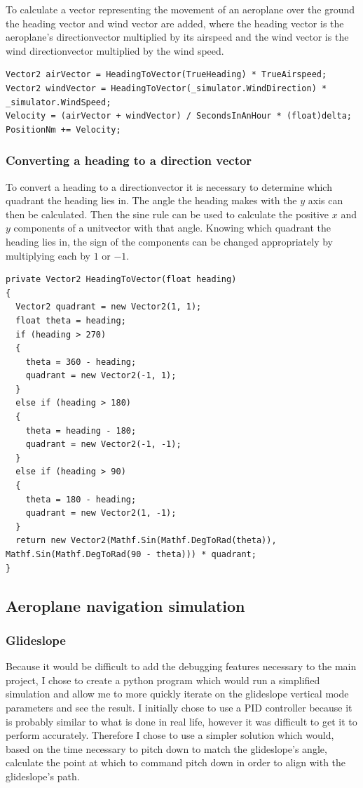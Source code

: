 \documentclass{article}
\begin{document}
To calculate a \gls{vector} representing the movement of an aeroplane over the ground the heading \gls{vector} and wind \gls{vector} are added, where the \gls{heading} \gls{vector} is the aeroplane's \gls{directionvector} multiplied by its \gls{airspeed} and the wind \gls{vector} is the wind \gls{directionvector} multiplied by the wind speed.
\lstset{style=csharp}
\begin{lstlisting}[caption=Extract of the aeroplane physics process]
Vector2 airVector = HeadingToVector(TrueHeading) * TrueAirspeed;
Vector2 windVector = HeadingToVector(_simulator.WindDirection) * _simulator.WindSpeed;
Velocity = (airVector + windVector) / SecondsInAnHour * (float)delta;
PositionNm += Velocity;
\end{lstlisting}

\subsubsection{Converting a heading to a direction vector}
To convert a \gls{heading} to a \gls{directionvector} it is necessary to determine which \gls{quadrant} the \gls{heading} lies in.
The angle the \gls{heading} makes with the $y$ axis can then be calculated.
Then the sine rule can be used to calculate the positive $x$ and $y$ components of a \gls{unitvector} with that angle.
Knowing which \gls{quadrant} the \gls{heading} lies in, the sign of the components can be changed appropriately by multiplying each by $1$ or $-1$.
\lstset{style=csharp}
\begin{lstlisting}[caption=Converting a heading to a vector]
private Vector2 HeadingToVector(float heading)
{
  Vector2 quadrant = new Vector2(1, 1);
  float theta = heading;
  if (heading > 270)
  {
    theta = 360 - heading;
    quadrant = new Vector2(-1, 1);
  }
  else if (heading > 180)
  {
    theta = heading - 180;
    quadrant = new Vector2(-1, -1);
  }
  else if (heading > 90)
  {
    theta = 180 - heading;
    quadrant = new Vector2(1, -1);
  }
  return new Vector2(Mathf.Sin(Mathf.DegToRad(theta)), Mathf.Sin(Mathf.DegToRad(90 - theta))) * quadrant;
}
\end{lstlisting}


\subsection{Aeroplane navigation simulation}
\subsubsection{Glideslope}
Because it would be difficult to add the debugging features necessary to the main project, I chose to create a python program which would run a simplified simulation and allow me to more quickly iterate on the glideslope vertical mode parameters and see the result.
I initially chose to use a PID controller\cite{pidcontroller} because it is probably similar to what is done in real life, however it was difficult to get it to perform accurately.
Therefore I chose to use a simpler solution which would, based on the time necessary to pitch down to match the glideslope's angle, calculate the point at which to command pitch down in order to align with the glideslope's path.
\end{document}
